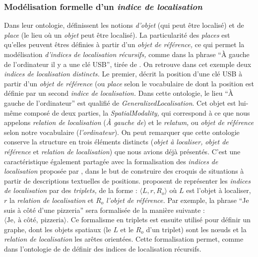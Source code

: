 \subsubsection{Modélisation formelle d'un \emph{indice de localisation}}

Dans leur ontologie, \textcite{Bateman2010} définissent les notions
\emph{d'objet} (qui peut être localisé) et de \emph{place} (le lieu où
un \emph{objet} peut être localisé). La particularité des
\emph{places} est qu'elles peuvent êtres définies à partir d'un
\emph{objet de référence,} ce qui permet la modélisation
\emph{d'indices de localisation récursifs,} comme dans la phrase
\enquote{À gauche de l'ordinateur il y a une clé USB}, tirée de
\textcite{Bateman2010}. On retrouve dans cet exemple deux
\emph{indices de localisation distincts.} Le premier, décrit la
position d'une clé USB à partir d'un \emph{objet de référence} (ou
\emph{place} selon le vocabulaire de \textcite{Bateman2010} dont la
position est définie par un second \emph{indice de localisation.} Dans
cette ontologie, le lieu \enquote{À gauche de l'ordinateur} est
qualifié de \emph{GeneralizedLocalisation}. Cet objet est lui-même
composé de deux parties, la \emph{SpatialModality,} qui correspond à
ce que nous appelons \emph{relation de localisation} (\emph{À gauche
  de}) et le \emph{relatum,} ou \emph{objet de référence} selon notre
vocabulaire (\emph{l'ordinateur}). On peut remarquer que cette
ontologie conserve la structure en trois éléments distincts
(\emph{objet à localiser,} \emph{objet de référence} et \emph{relation
  de localisation}) que nous avions déjà présentés. C'est une
caractéristique également partagée avec la formalisation des
\emph{indices de localisation} proposée par \textcite{Vasardini2013},
dans le but de construire des croquis de situations à partir de
descriptions textuelles de positions. \textcite{Vasardini2013}
proposent de représenter les \emph{indices de localisation} par des
\emph{triplets,} de la forme : \(\langle L, r, R_o\rangle\) où \(L\)
est l'objet à localiser, \(r\) la \emph{relation de localisation} et
\(R_o\) \emph{l'objet de référence.} Par exemple, la phrase
\enquote{Je suis à côté d'une pizzeria} sera formalisée de la manière
suivante :
\(\langle \text{Je},\ \text{à côté},\ \text{pizzeria} \rangle\). Ce
formalisme en triplets est ensuite utilisé pour définir un graphe,
dont les objets spatiaux (\ie le \(L\) et le \(R_o\) d'un triplet)
sont les nœuds et la \emph{relation de localisation} les arêtes
orientées. Cette formalisation permet, comme dans l'ontologie de
\textcite{Bateman2010} de définir des indices de localisation
récursifs.

